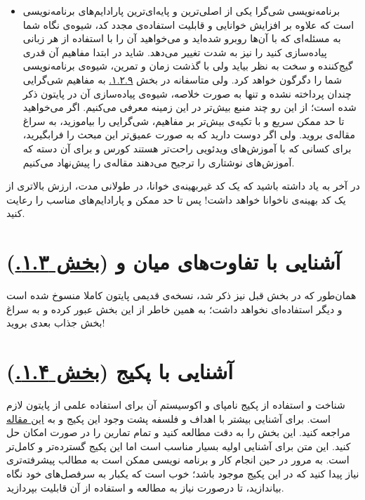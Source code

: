 \documentclass[11pt, a4paper]{article}
\begin{document}
\begin{itemize}[label=\Large $\bullet$]
  \item
  برنامه‌نویسی شی‌گرا یکی از اصلی‌ترین و پایه‌ای‌ترین پارادایم‌های برنامه‌نویسی است
  که علاوه بر افزایش خوانایی و قابلیت استفاده‌ی مجدد کد،
  شیوه‌ی نگاه شما به مسئله‌ای که با آن‌ها روبرو شده‌اید
  و می‌خواهید آن را با استفاده از هر زبانی پیاده‌سازی کنید را نیز به شدت تغییر می‌دهد.
  شاید در ابتدا مفاهیم آن قدری گیج‌کننده و سخت به نظر بیاید ولی با گذشت زمان و تمرین،
  شیوه‌ی برنامه‌نویسی شما را دگرگون خواهد کرد.
  ولی متاسفانه در بخش
  \href{https://scipy-lectures.org/intro/language/oop.html}{۱.۲.۹.}
  به مفاهیم شی‌گرایی چندان پرداخته نشده و تنها به صورت خلاصه، شیوه‌ی پیاده‌سازی‌ آن در پایتون ذکر شده است؛
  از این رو چند منبع بیش‌تر در این زمینه معرفی می‌کنیم.
  اگر می‌خواهید تا حد ممکن سریع و با تکیه‌ی بیش‌تر بر مفاهیم، شی‌گرایی را بیاموزید،
  به سراغ مقاله‌ی
  \href{https://towardsdatascience.com/understand-o-o-p-in-python-with-one-article-bfa76f3ba48c}{}
  بروید.
  ولی اگر دوست دارید که به صورت عمیق‌تر این مبحث را فرابگیرید،
  برای کسانی که با آموزش‌های ویدئویی راحت‌تر هستند کورس
  \href{https://learn.datacamp.com/courses/object-oriented-programming-in-python}{}
  و برای آن دسته که آموزش‌های نوشتاری را ترجیح می‌دهند مقاله‌ی
  \href{https://realpython.com/python3-object-oriented-programming/}{}
  را پیش‌نهاد می‌کنیم.
\end{itemize}

در آخر به یاد داشته باشید که یک کد غیربهینه‌ی خوانا،
در طولانی مدت،
ارزش بالاتری از یک کد بهینه‌ی ناخوانا خواهد داشت!
پس تا حد ممکن
و پارادایم‌های مناسب را رعایت کنید.


\section{آشنایی با تفاوت‌های میان  و  (\href{https://scipy-lectures.org/intro/python_2_python_3.html}{بخش ۱.۳.})}
همان‌طور که در بخش قبل نیز ذکر شد،
نسخه‌ی قدیمی پایتون کاملا منسوخ شده است و دیگر استفاده‌ای نخواهد داشت؛
به همین خاطر از این بخش عبور کرده و به سراغ بخش جذاب بعدی بروید!


\section{آشنایی با پکیج   (\href{https://scipy-lectures.org/intro/numpy/index.html}{بخش ۱.۴.})}

شناخت و استفاده از پکیج نامپای و اکوسیستم آن برای استفاده علمی از پایتون لازم است. 
برای آشنایی بیشتر با اهداف و فلسفه پشت وجود این پکیج و  به \href{https://www.nature.com/articles/s41586-020-2649-2}{این مقاله} مراجعه کنید.
این بخش را به دقت مطالعه کنید و تمام تمارین را در صورت امکان حل کنید.
این متن برای آشنایی اولیه بسیار مناسب است اما این پکیج گسترده‌تر و کامل‌تر است.
به مرور در حین انجام کار و برنامه نویسی ممکن است به مطالب پیشرفته‌تری نیاز پیدا کنید
که در این پکیج موجود باشد؛
خوب است که یکبار به سرفصل‌های خود
\href{https://numpy.org/doc/}{}
نگاه بیاندازید،
تا درصورت نیاز به مطالعه و استفاده از آن قابلیت بپردازید.
  
\end{document}

